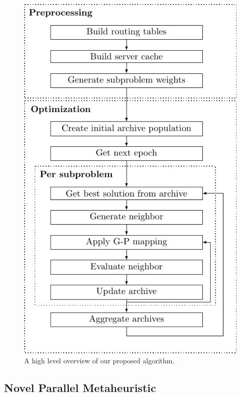 \begin{figure}
    \includegraphics{figures/operators/alg_flowchart}
    \caption{A high level overview of our proposed algorithm.}
    \label{fig:overview}
\end{figure}

\subsection{Novel Parallel Metaheuristic}
\label{sec:core_algorithm}

